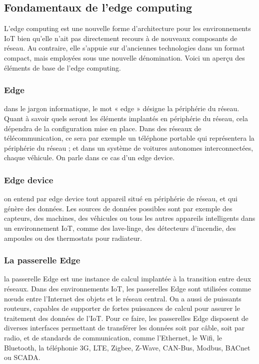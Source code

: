 \subsection{Fondamentaux de l’edge computing}
L’edge computing est une nouvelle forme d’architecture pour les environnements IoT bien qu’elle n’ait pas directement recours à de nouveaux composants de réseau. Au contraire, elle s’appuie sur d’anciennes technologies dans un format compact, mais employées sous une nouvelle dénomination. Voici un aperçu des éléments de base de l’edge computing.
\subsubsection{Edge}dans le jargon informatique, le mot « edge » désigne la périphérie du réseau. Quant à savoir quels seront les éléments implantés en périphérie du réseau, cela dépendra de la configuration mise en place. Dans des réseaux de télécommunication, ce sera par exemple un téléphone portable qui représentera la périphérie du réseau ; et dans un système de voitures autonomes interconnectées, chaque véhicule. On parle dans ce cas d’un edge device.
\subsubsection{Edge device}on entend par edge device tout appareil situé en périphérie de réseau, et qui génère des données. Les sources de données possibles sont par exemple des capteurs, des machines, des véhicules ou tous les autres appareils intelligents dans un environnement IoT, comme des lave-linge, des détecteurs d’incendie, des ampoules ou des thermostats pour radiateur.
\subsubsection{La passerelle Edge} la passerelle Edge est une instance de calcul implantée à la transition entre deux réseaux. Dans des environnements IoT, les passerelles Edge sont utilisées comme nœuds entre l’Internet des objets et le réseau central. On a aussi de puissants routeurs, capables de supporter de fortes puissances de calcul pour assurer le traitement des données de l’IoT. Pour ce faire, les passerelles Edge disposent de diverses interfaces permettant de transférer les données soit par câble, soit par radio, et de standards de communication, comme l’Ethernet, le Wifi, le Bluetooth, la téléphonie 3G, LTE, Zigbee, Z-Wave, CAN-Bus, Modbus, BACnet ou SCADA.
